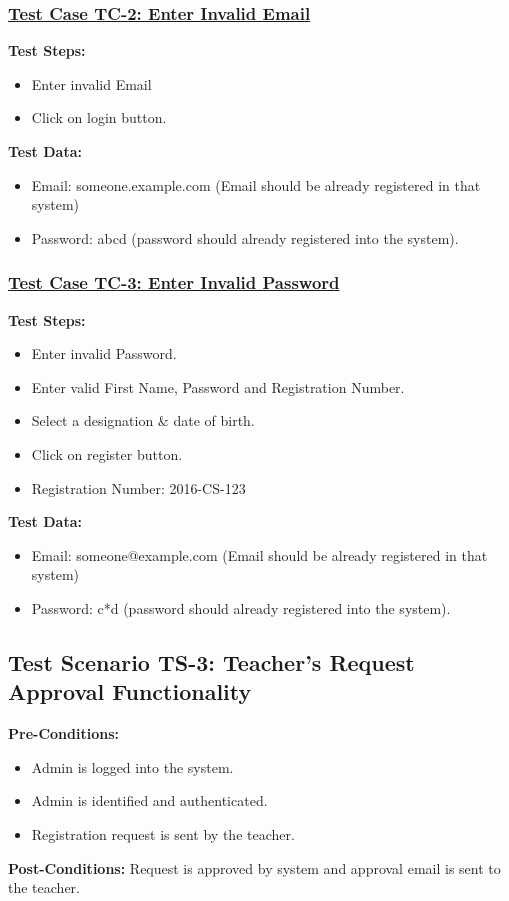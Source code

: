 \subsubsection{\underline{Test Case TC-2: Enter Invalid Email}}
\textbf{Test Steps:}
\begin{itemize}

\item Enter invalid Email
\item Click on login button.

\end{itemize}

\textbf{Test Data:}
\begin{itemize}

\item Email: someone.example.com (Email should be already registered in that system)
\item Password: abcd (password should already registered into the system).

\end{itemize}

\subsubsection{\underline{Test Case TC-3: Enter Invalid Password}}
\textbf{Test Steps:}
\begin{itemize}

\item Enter invalid Password.
\item Enter valid First Name, Password and Registration Number.
\item Select a designation \& date of birth.
\item Click on register button.
\item Registration Number: 2016-CS-123

\end{itemize}

\textbf{Test Data:}
\begin{itemize}

\item Email: someone@example.com (Email should be already registered in that system)
\item Password: c*d (password should already registered into the system).

\end{itemize}




\subsection{Test Scenario TS-3: Teacher's Request Approval Functionality}
\textbf{Pre-Conditions: }
\begin{itemize}

\item Admin is logged into the system.
\item Admin is identified and authenticated.
\item Registration request is sent by the teacher.

\end{itemize}
\textbf{Post-Conditions: } Request is approved by system and approval email is sent to the teacher. 

